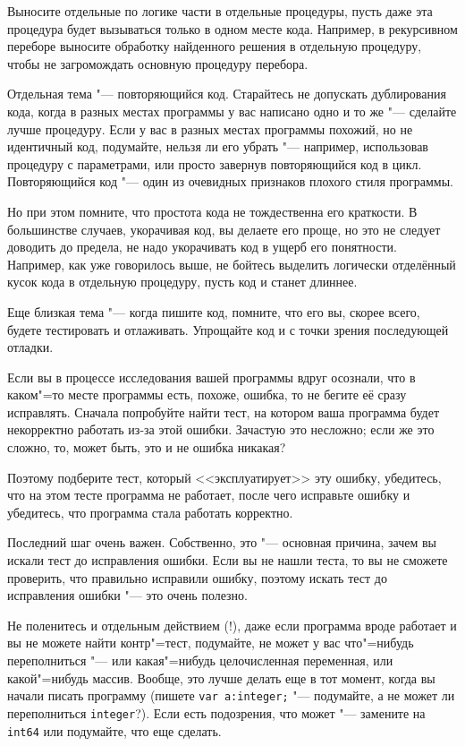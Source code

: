 Выносите отдельные по логике части в отдельные процедуры, пусть даже эта процедура будет вызываться только в одном месте кода. 
Например, в рекурсивном переборе выносите обработку найденного решения в отдельную процедуру, чтобы не загромождать основную процедуру перебора.

Отдельная тема "--- повторяющийся код. 
Старайтесь не допускать дублирования кода, когда в разных местах программы у вас написано одно и то же "--- сделайте лучше процедуру.
Если у вас в разных местах программы похожий, но не идентичный код, подумайте, нельзя ли его убрать "--- например, использовав процедуру с параметрами,
или просто завернув повторяющийся код в цикл. 
Повторяющийся код "--- один из очевидных признаков плохого стиля программы.

Но при этом помните, что простота кода не тождественна его краткости. 
В большинстве случаев, укорачивая код, вы делаете его проще, но это не следует доводить до предела, не надо укорачивать код в ущерб его понятности.
Например, как уже говорилось выше, не бойтесь выделить логически отделённый кусок кода в отдельную процедуру, пусть код и станет длиннее.

Еще близкая тема "--- когда пишите код, помните, что его вы, скорее всего, будете тестировать и отлаживать. 
Упрощайте код и с точки зрения последующей отладки.

Если вы в процессе исследования вашей программы вдруг осознали, что в каком"=то месте программы есть, похоже, ошибка, то не бегите её сразу исправлять.
Сначала попробуйте найти тест, на котором ваша программа будет некорректно работать из-за этой ошибки.
Зачастую это несложно; если же это сложно, то, может быть, это и не ошибка никакая? 

Поэтому подберите тест, который <<эксплуатирует>> эту ошибку, убедитесь, что на этом тесте программа не работает, после чего исправьте ошибку и убедитесь,
что программа стала работать корректно.

Последний шаг очень важен. Собственно, это "--- основная причина, зачем вы искали тест до исправления ошибки. 
Если вы не нашли теста, то вы не сможете проверить, что правильно исправили ошибку, поэтому искать тест до исправления ошибки "--- это очень полезно.

Не поленитесь и отдельным действием (!), даже если программа вроде работает и вы не можете найти контр"=тест, подумайте,
не может у вас что"=нибудь переполниться "--- или какая"=нибудь целочисленная переменная, или какой"=нибудь массив. 
Вообще, это лучше делать еще в тот момент, когда вы начали писать программу (пишете \verb`var a:integer;` "--- подумайте, а не может ли переполниться
\verb`integer`?). Если есть подозрения, что может "--- замените на \verb`int64` или подумайте, что еще сделать.

